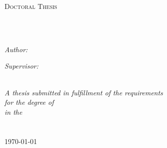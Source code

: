 




\frontmatter %

\pagestyle{plain} %


\begin{titlepage}
\begin{center}

{\scshape\LARGE \univname\par}\vspace{1.5cm} %
\textsc{\Large Doctoral Thesis}\\[0.5cm] %

\HRule \\[0.4cm] %
{\huge \bfseries \ttitle\par}\vspace{0.4cm} %
\HRule \\[1.5cm] %
 
\begin{minipage}[t]{0.4\textwidth}
\begin{flushleft} \large
\emph{Author:}\\
\href{http://www.johnsmith.com}{\authorname} %
\end{flushleft}
\end{minipage}
\begin{minipage}[t]{0.4\textwidth}
\begin{flushright} \large
\emph{Supervisor:} \\
\href{http://www.jamessmith.com}{\supname} %
\end{flushright}
\end{minipage}\\[3cm]
 
\large \textit{A thesis submitted in fulfillment of the requirements\\ for the degree of \degreename}\\[0.3cm] %
\textit{in the}\\[0.4cm]
\groupname\\\deptname\\[2cm] %
 
{\large \today}\\[4cm] %
 
\vfill
\end{center}
\end{titlepage}



